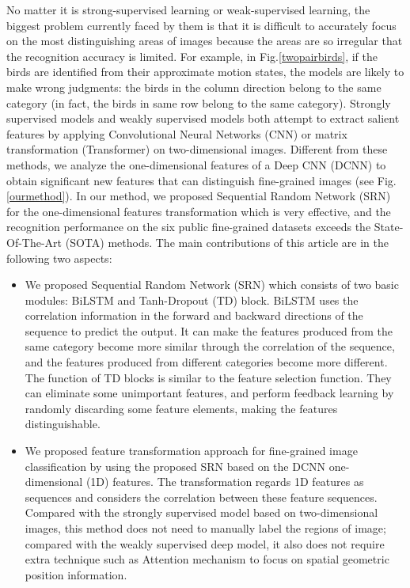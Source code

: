 \documentclass[10pt,twocolumn,letterpaper]{article}
\begin{document}
No matter it is strong-supervised learning or weak-supervised learning, the biggest problem currently faced by them is that it is difficult to accurately focus on the most distinguishing areas of images because the areas are so irregular that the recognition accuracy is limited. For example, in Fig.\ref{twopairbirds}, if the birds are identified from their approximate motion states, the models are likely to make wrong judgments: the birds in the column direction belong to the same category (in fact, the birds in same row belong to the same category). Strongly supervised models and weakly supervised models both attempt to extract salient features by applying Convolutional Neural Networks (CNN) or matrix transformation (Transformer) on two-dimensional images. Different from these methods, we analyze the one-dimensional features of a Deep CNN (DCNN) to obtain significant new features that can distinguish fine-grained images (see Fig.\ref{ourmethod}). In our method, we proposed Sequential Random Network (SRN) for the one-dimensional features transformation which is very effective, and the recognition performance on the six public fine-grained datasets exceeds the State-Of-The-Art (SOTA) methods. The main contributions of this article are in the following two aspects:	
\begin{itemize}									
	\item We proposed Sequential Random Network (SRN) which consists of two basic modules: BiLSTM and Tanh-Dropout (TD) block. BiLSTM uses the correlation information in the forward and backward directions of the sequence to predict the output. It can make the features produced from the same category become more similar through the correlation of the sequence, and the features produced from different categories become more different. The function of TD blocks is similar to the feature selection function. They can eliminate some unimportant features, and perform feedback learning by randomly discarding some feature elements, making the features distinguishable.	
	\item We proposed feature transformation approach for fine-grained image classification by using the proposed SRN based on the DCNN one-dimensional (1D) features. The transformation regards 1D features as sequences and considers the correlation between these feature sequences. Compared with the strongly supervised model based on two-dimensional images, this method does not need to manually label the regions of image; compared with the weakly supervised deep model, it also does not require extra technique such as Attention mechanism to focus on spatial geometric position information.
\end{itemize} 				
\end{document}
